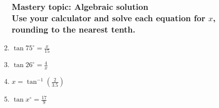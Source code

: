 \begin{enumerate}
\subsubsection*{Mastery topic: Algebraic solution\\[0.5cm]
Use your calculator and solve each equation for $x$, rounding to the nearest tenth.}
\item $\displaystyle \tan 75^\circ = \frac{x}{15}$ \vspace{3cm}
\item $\displaystyle \tan 26^\circ = \frac{4}{x}$ \vspace{4cm}
\item $\displaystyle x = \tan^{-1} (\frac{2}{3.5})$ \vspace{3cm}
\item $\displaystyle \tan x^\circ = \frac{17}{9}$ \vspace{3cm}

\end{enumerate}

